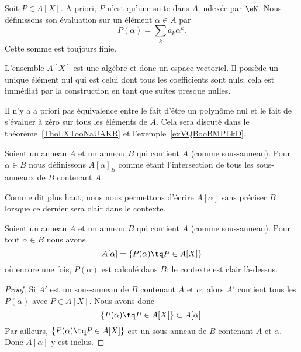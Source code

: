 Soit \( P\in A[X]\). A priori, \( P\) n'est qu'une suite dans \( A\) indexée par \( \eN\). Nous définissons son évaluation sur un élément \( \alpha\in A\) par
\begin{equation}
    P(\alpha)=\sum_ka_k\alpha^k.
\end{equation}
Cette somme est toujours finie.

\begin{normaltext}      \label{NORMooQFTJooLBcPxl}
    L'ensemble \( A[X]\) est une algèbre et donc un espace vectoriel. Il possède un unique élément nul qui est celui dont tous les coefficients sont nuls; cela est immédiat par la construction en tant que suites presque nulles.
\end{normaltext}

Il n'y a a priori pas équivalence entre le fait d'être un polynôme nul et le fait de s'évaluer à zéro sur tous les éléments de \( A\). Cela sera discuté dans le théorème~\ref{ThoLXTooNaUAKR} et l'exemple~\ref{exVQBooBMPLkD}.

\begin{definition}      \label{DEFooRFBFooKCXQsv}
    Soient un anneau \( A\) et un anneau \( B\) qui contient \( A\) (comme sous-anneau). Pour \( \alpha\in B\) nous définissons \( A[\alpha]_B\) comme étant l'intersection de tous les sous-anneaux de \( B\) contenant \( A\).
\end{definition}
Comme dit plus haut, nous nous permettons d'écrire \( A[\alpha]\) sans préciser \( B\) lorsque ce dernier sera clair dans le contexte.

\begin{proposition}     \label{PROPooPMNSooOkHOxJ}
    Soient un anneau \( A\) et un anneau \( B\) qui contient \( A\) (comme sous-anneau). Pour tout \( \alpha\in B\) nous avons
    \begin{equation}
        A[\alpha]=\{ P(\alpha)\tq P\in A[X] \}
    \end{equation}
    où encore une fois, \( P(\alpha)\) est calculé dans \( B\); le contexte est clair là-dessus.
\end{proposition}

\begin{proof}
    Si \( A'\) est un sous-anneau de \( B\) contenant \( A\) et \( \alpha\), alors \( A'\) contient tous les \( P(\alpha)\) avec \( P\in A[X]\). Nous avons donc
    \begin{equation}
        \{ P(\alpha)\tq P\in A[X] \}\subset A[\alpha].
    \end{equation}
    Par ailleurs, \( \{ P(\alpha)\tq P\in A[X] \}\) est un sous-anneau de \( B\) contenant \( A\) et \( \alpha\). Donc \( A[\alpha]\) y est inclus.
\end{proof}

